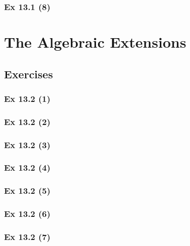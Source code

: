 \subsubsection{Ex 13.1 (8)}\label{sec:Ex_13.1.8}

\newpage		%

\section{The Algebraic Extensions}\label{sec:13.2}	
\subsection*{Exercises}\label{sec:13.2_Exercises}

\subsubsection{Ex 13.2 (1)}\label{sec:Ex_13.2.1}

\subsubsection{Ex 13.2 (2)}\label{sec:Ex_13.2.2}

\subsubsection{Ex 13.2 (3)}\label{sec:Ex_13.2.3}

\subsubsection{Ex 13.2 (4)}\label{sec:Ex_13.2.4}

\subsubsection{Ex 13.2 (5)}\label{sec:Ex_13.2.5}

\subsubsection{Ex 13.2 (6)}\label{sec:Ex_13.2.6}

\subsubsection{Ex 13.2 (7)}\label{sec:Ex_13.2.7}

